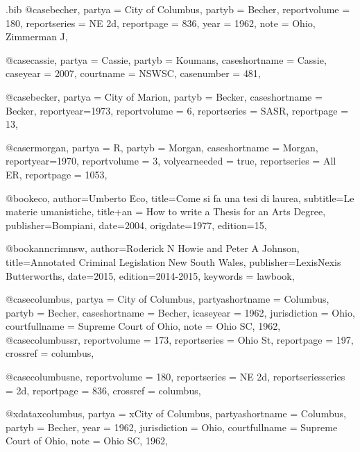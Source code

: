 \begin{filecontents*}[overwrite]{\jobname.bib}
@case{becher,
  partya = {City of Columbus}, 
  partyb = {Becher},
  reportvolume = {180},
  reportseries = {NE 2d},
  reportpage = {836},
  year = {1962},
  note = {Ohio, Zimmerman J},
	}


@case{cassie,
  partya = {Cassie}, 
  partyb = {Koumans},
  caseshortname = {Cassie},
  caseyear = {2007},
  courtname = {NSWSC},
  casenumber = {481},
	}


@case{becker,
  partya = {City of Marion}, 
  partyb = {Becker},
  caseshortname = {Becker},
  reportyear={1973},
  reportvolume = {6},
  reportseries = {SASR},
  reportpage = {13},
	}

@case{rmorgan,
  partya = {R}, 
  partyb = {Morgan},
  caseshortname = {Morgan},
  reportyear={1970},
  reportvolume = {3},
  volyearneeded = {true},
  reportseries = {All ER},
  reportpage = {1053},
	}


@book{eco,
author={Umberto Eco},
title={Come si fa una tesi di laurea},
subtitle={Le materie umanistiche},
title+an = {How to write a Thesis for an Arts Degree},
publisher={Bompiani},
date={2004},
origdate={1977},
edition={15},
}

@book{anncrimnsw,
author={Roderick N Howie and Peter A Johnson},
title={Annotated Criminal Legislation New South Wales},
publisher={LexisNexis Butterworths},
date={2015},
edition={2014-2015},
keywords = {lawbook},
}

@case{columbus,
  partya = {City of Columbus},
  partyashortname = {Columbus}, 
  partyb = {Becher},
  caseshortname = {Becher},
  icaseyear = {1962},
  jurisdiction = {Ohio},
  courtfullname = {Supreme Court of Ohio},
  note = {Ohio SC, 1962},
	}
@case{columbussr,
  reportvolume = {173},
  reportseries = {Ohio St},
  reportpage = {197},
  crossref = {columbus},
}

@case{columbusne,
  reportvolume = {180},
  reportseries = {NE 2d},
  reportseriesseries = {2d},
  reportpage = {836},
  crossref = {columbus},
}

@xdata{xcolumbus,
  partya = {xCity of Columbus},
  partyashortname = {Columbus}, 
  partyb = {Becher},
  year = {1962},
  jurisdiction = {Ohio},
  courtfullname = {Supreme Court of Ohio},
  note = {Ohio SC, 1962},
	}
	

\end{filecontents*}
